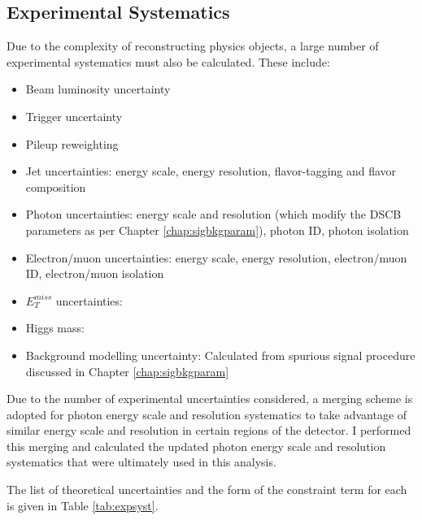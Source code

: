 \subsection{Experimental Systematics}

Due to the complexity of reconstructing physics objects, a large number of experimental systematics must also be calculated.
These include:

\begin{itemize}
\item Beam luminosity uncertainty \cite{ATLAS-CONF-2019-021}
\item Trigger uncertainty \cite{trigger} \cite{triggerperformance}
\item Pileup reweighting
\item Jet uncertainties: energy scale, energy resolution,  flavor-tagging and flavor composition \cite{jetuncs1} \cite{jetuncs2} \cite{jetuncs3} \cite{jetuncs4}
\item Photon uncertainties: energy scale and resolution (which modify the DSCB parameters as per Chapter \ref{chap:sigbkgparam}), photon ID, photon isolation \cite{CERN-EP-2019-145} \cite{photuncs}
\item Electron/muon uncertainties: energy scale, energy resolution, electron/muon ID, electron/muon isolation \cite{CERN-EP-2019-145} \cite{photuncs} \cite{elID-CERN-EP-2018-273} \cite{CERN-EP-2016-033}
\item $E_T^{miss}$ uncertainties: \cite{MET1} \cite{MET2}
\item Higgs mass: \cite{Higgsmass}
\item Background modelling uncertainty: Calculated from spurious signal procedure discussed in Chapter \ref{chap:sigbkgparam}
\end{itemize}

Due to the number of experimental uncertainties considered, a merging scheme is adopted for photon energy scale and resolution systematics to take advantage of similar energy scale and resolution in certain regions of the detector. I performed this merging and calculated the updated photon energy scale and resolution systematics that were ultimately used in this analysis.

The list of theoretical uncertainties and the form of the constraint term for each is given in Table \ref{tab:expsyst}.

